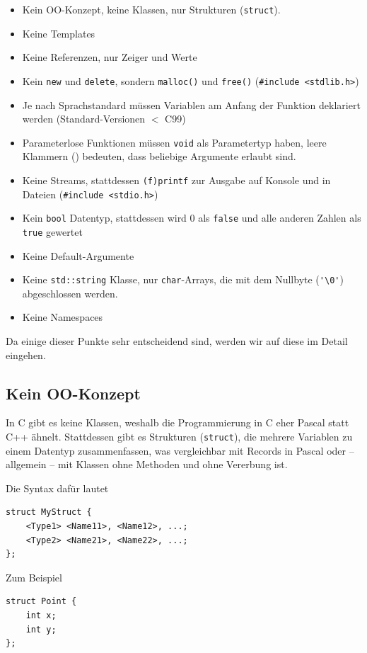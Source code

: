 \begin{itemize}
	\item Kein OO-Konzept, keine Klassen, nur Strukturen (\texttt{struct}).
	\item Keine Templates
	\item Keine Referenzen, nur Zeiger und Werte
	\item Kein \texttt{new} und \texttt{delete}, sondern \texttt{malloc()} und \texttt{free()} (\verb|#include <stdlib.h>|)
	\item Je nach Sprachstandard müssen Variablen am Anfang der Funktion deklariert werden (Standard-Versionen $<$ C99)
	\item Parameterlose Funktionen müssen \texttt{void} als Parametertyp haben, leere Klammern () bedeuten, dass beliebige Argumente erlaubt sind.
	\item Keine Streams, stattdessen \texttt{(f)printf} zur Ausgabe auf Konsole und in Dateien (\verb|#include <stdio.h>|)
	\item Kein \texttt{bool} Datentyp, stattdessen wird 0 als \texttt{false} und alle anderen Zahlen als \texttt{true} gewertet
	\item Keine Default-Argumente
	\item Keine \texttt{std::string} Klasse, nur \texttt{char}-Arrays, die mit dem Nullbyte (\verb|'\0'|) abgeschlossen werden.
	\item Keine Namespaces
\end{itemize}

Da einige dieser Punkte sehr entscheidend sind, werden wir auf diese im Detail eingehen.

\subsection{Kein OO-Konzept}
In C gibt es keine Klassen, weshalb die Programmierung in C eher Pascal statt C++ ähnelt.
Stattdessen gibt es Strukturen (\texttt{struct}), die mehrere Variablen zu einem Datentyp zusammenfassen, was vergleichbar mit Records in Pascal oder -- allgemein -- mit Klassen ohne Methoden und ohne Vererbung ist.

Die Syntax dafür lautet

\begin{lstlisting}
struct MyStruct {
	<Type1> <Name11>, <Name12>, ...;
	<Type2> <Name21>, <Name22>, ...;
};
\end{lstlisting}

Zum Beispiel

\begin{lstlisting}
struct Point {
	int x;
	int y;
};
\end{lstlisting}

